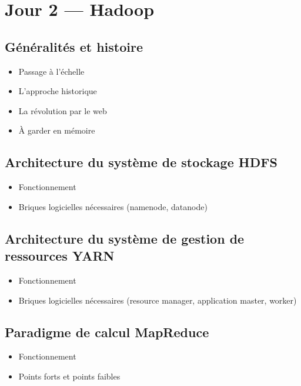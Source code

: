 \documentclass[utf8,12pt,draft]{article}
\begin{document}
\section{Jour 2 --- {\sc Hadoop} \cite{wikihadoop}}

\subsection{G\'en\'eralit\'es et histoire}
\begin{itemize}
\item Passage \`a l'\'echelle \cite{wikiscala} \cite{wikigrille} \cite{wikicalcdist}
\item L'approche historique \cite{wikisuperordi} \cite{wikiomp}
\item La révolution par le web \cite{wikigrappe} \cite{wikicluster}
\item \`A garder en mémoire \cite{wikiillus}
\end{itemize}

\subsection{Architecture du syst\`eme de stockage {\sc HDFS}}
\begin{itemize}
\item Fonctionnement
\item Briques logicielles n\'ecessaires (namenode, datanode)
\end{itemize}


\subsection{Architecture du syst\`eme de gestion de ressources {\sc YARN}}
\begin{itemize}
\item Fonctionnement
\item Briques logicielles n\'ecessaires (resource manager, application master, worker)
\end{itemize}

\subsection{Paradigme de calcul {\sc MapReduce} \cite{wikimapred}}
\begin{itemize}
\item Fonctionnement
\item Points forts et points faibles
\end{itemize}
\end{document}
